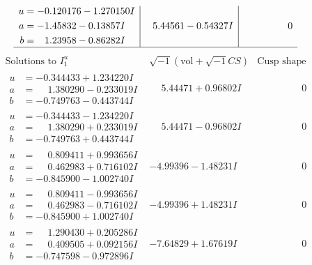 \documentclass[1p]{elsarticle_modified}
\theoremstyle{definition}
\newcommand{\I}{\sqrt{-1}}
\begin{document}
$$\begin{array}{c|c|c}
\begin{aligned}
u &= -0.120176 - 1.270150 I \\
a &= -1.45832 - 0.13857 I \\
b &= \phantom{-}1.23958 - 0.86282 I\end{aligned}
 & \phantom{-}5.44561 - 0.54327 I & \phantom{-0.000000 } 0\\
 \hline 
 \end{array}$$\newpage$$\begin{array}{c|c|c}  
\text{Solutions to }I^u_{1}& \I (\text{vol} + \sqrt{-1}CS) & \text{Cusp shape}\\
 \hline 
\begin{aligned}
u &= -0.344433 + 1.234220 I \\
a &= \phantom{-}1.380290 - 0.233019 I \\
b &= -0.749763 - 0.443744 I\end{aligned}
 & \phantom{-}5.44471 + 0.96802 I & \phantom{-0.000000 } 0 \\ \hline\begin{aligned}
u &= -0.344433 - 1.234220 I \\
a &= \phantom{-}1.380290 + 0.233019 I \\
b &= -0.749763 + 0.443744 I\end{aligned}
 & \phantom{-}5.44471 - 0.96802 I & \phantom{-0.000000 } 0 \\ \hline\begin{aligned}
u &= \phantom{-}0.809411 + 0.993656 I \\
a &= \phantom{-}0.462983 + 0.716102 I \\
b &= -0.845900 - 1.002740 I\end{aligned}
 & -4.99396 - 1.48231 I & \phantom{-0.000000 } 0 \\ \hline\begin{aligned}
u &= \phantom{-}0.809411 - 0.993656 I \\
a &= \phantom{-}0.462983 - 0.716102 I \\
b &= -0.845900 + 1.002740 I\end{aligned}
 & -4.99396 + 1.48231 I & \phantom{-0.000000 } 0 \\ \hline\begin{aligned}
u &= \phantom{-}1.290430 + 0.205286 I \\
a &= \phantom{-}0.409505 + 0.092156 I \\
b &= -0.747598 - 0.972896 I\end{aligned}
 & -7.64829 + 1.67619 I & \phantom{-0.000000 } 0 \\ \hline\begin{aligned}

\end{aligned}
\end{array}$$
\end{document}
